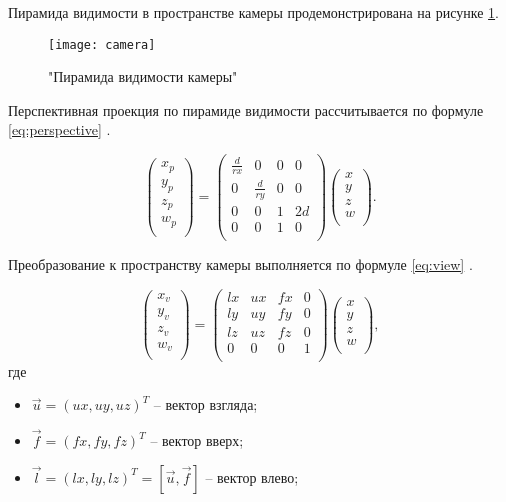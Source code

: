 Пирамида видимости в пространстве камеры продемонстрирована на рисунке \ref{fig:camera}.

\begin{figure}[H]
	\centering
	\texttt{[image: camera]}
	\caption{"Пирамида видимости камеры"}
	\label{fig:camera}
\end{figure}

Перспективная проекция по пирамиде видимости рассчитывается по формуле \ref{eq:perspective} \cite{projection}.

\begin{equation}
	\label{eq:perspective}
	\begin{pmatrix}
		x_p \\
		y_p \\
		z_p \\
		w_p \\
	\end{pmatrix} = 
	\begin{pmatrix}
		\frac{d}{rx}  & 0 & 0 & 0 \\
		0 & \frac{d}{ry} & 0 & 0 \\
		0 & 0 & 1 & 2d \\
		0 & 0 & 1 & 0 \\
	\end{pmatrix}
	\begin{pmatrix}
		x \\
		y \\
		z \\
		w \\
	\end{pmatrix}.
\end{equation}

Преобразование к пространству камеры выполняется по формуле \ref{eq:view} \cite{view}.

\begin{equation}
	\label{eq:view}
	\begin{pmatrix}
		x_v \\
		y_v \\
		z_v \\
		w_v \\
	\end{pmatrix} = 
	\begin{pmatrix}
		lx & ux & fx & 0 \\
		ly & uy & fy & 0 \\
		lz & uz & fz & 0 \\
		0 & 0 & 0 & 1 \\
	\end{pmatrix}
	\begin{pmatrix}
		x \\
		y \\
		z \\
		w \\
	\end{pmatrix},
\end{equation}
где
\begin{itemize}
	\item $\vec{u} = (ux, uy, uz)^T$ -- вектор взгляда;
	\item $\vec{f} = (fx, fy, fz)^T$ -- вектор вверх;
	\item $\vec{l} = (lx, ly, lz)^T = [\vec{u}, \vec{f}]$ -- вектор влево;
\end{itemize}


